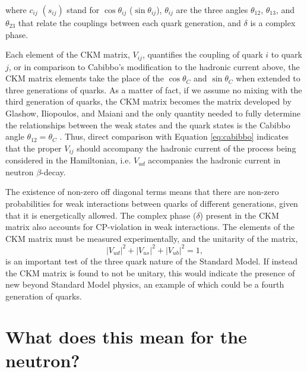 \noindent where $c_{ij}$ $(s_{ij})$ stand for $\cos\theta_{ij}$ ($\sin\theta_{ij}$), $\theta_{ij}$
are the three angles $\theta_{12}$, $\theta_{13}$, and $\theta_{23}$ that relate the couplings
between each quark generation, and $\delta$ is a
complex phase.

Each element of the CKM matrix, $V_{ij}$, quantifies the coupling of quark $i$
to quark $j$, or in comparison to Cabibbo's modification to the hadronic current
above, the CKM matrix elements take the place of the $\cos\theta_C$ and $\sin\theta_C$
when extended to three generations of quarks. As a matter of fact, if we assume no mixing
with the third generation of quarks, the CKM matrix becomes the matrix developed by
Glashow, Iliopoulos, and Maiani and the only quantity needed to fully determine
the relationships between the weak states and the quark states is the Cabibbo angle $\theta_{12}=\theta_C$
\cite{griffiths2008}.
Thus, direct comparison with Equation \ref{eq:cabibbo} indicates that the proper
$V_{ij}$ should accompany the hadronic current
of the process being considered in the Hamiltonian, i.e. $V_{ud}$ accompanies the hadronic
current in neutron $\beta$-decay.

The existence of non-zero off diagonal terms means that there are non-zero probabilities for
weak interactions between quarks of different generations, given that it is energetically
allowed. The complex phase ($\delta$) present in the CKM
matrix also accounts for CP-violation in weak interactions.
The elements of the CKM matrix must be measured experimentally, and the unitarity of the matrix,
%
\begin{equation}
  |V_{ud}|^2 + |V_{us}|^2 + |V_{ub}|^2 = 1,
\end{equation}
is an important test of the three quark nature of the Standard Model. If
instead the CKM matrix is found to not be unitary, this would indicate the presence of
new beyond Standard Model physics, an example of which could be a fourth generation of quarks.


\section{What does this mean for the neutron?}

